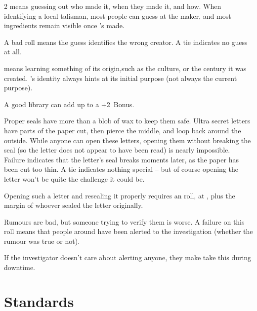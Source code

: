 \begin{multicols}{2}
%
%
means guessing out who made it, when they made it, and how.
When identifying a local \gls{talisman}, most people can guess at the maker, and most \glspl{ingredient} remain visible once 's made.

A bad roll means the guess identifies the wrong creator.
A tie indicates no guess at all.

means learning something of its origin,such as the culture, or the century it was created.
%
%
's identity always hints at its initial purpose (not always the current purpose).

A good library can add up to a +2~Bonus.

Proper seals have more than a blob of wax to keep them safe.
Ultra secret letters have parts of the paper cut, then pierce the middle, and loop back around the outside.
While anyone can open these letters, opening them without breaking the seal (so the letter does not appear to have been read) is nearly impossible.
Failure indicates that the letter's seal breaks moments later, as the paper has been cut too thin.
A tie indicates nothing special -- but of course opening the letter won't be quite the challenge it could be.

Opening such a letter and resealing it properly requires an  roll, at \tn[14], plus the margin of whoever sealed the letter originally.

Rumours are bad, but someone trying to verify them is worse.
A failure on this roll means that people around have been alerted to the investigation (whether the rumour was true or not).

If the investigator doesn't care about alerting anyone, they make take this  during \gls{downtime}.

\end{multicols}

\section{Standards}

